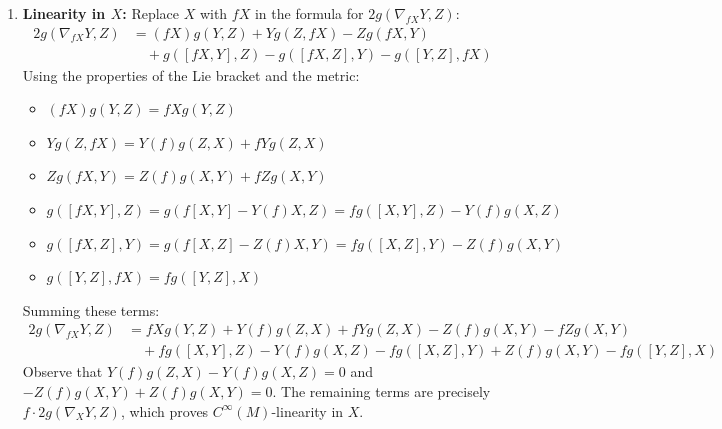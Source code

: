 \begin{solution}
\begin{enumerate}
    \item \textbf{Linearity in $X$:} Replace $X$ with $fX$ in the formula for $2g(\nabla_{fX} Y, Z)$:
    \[ \begin{aligned}
    2g(\nabla_{fX} Y, Z) &= (fX)g(Y, Z) + Yg(Z, fX) - Zg(fX, Y) \\
    &\quad + g([fX, Y], Z) - g([fX, Z], Y) - g([Y, Z], fX)
    \end{aligned} \]
    Using the properties of the Lie bracket and the metric:
    \begin{itemize}
        \item $(fX)g(Y, Z) = f Xg(Y, Z)$
        \item $Yg(Z, fX) = Y(f)g(Z, X) + f Yg(Z, X)$
        \item $Zg(fX, Y) = Z(f)g(X, Y) + f Zg(X, Y)$
        \item $g([fX, Y], Z) = g(f[X, Y] - Y(f)X, Z) = f g([X, Y], Z) - Y(f)g(X, Z)$
        \item $g([fX, Z], Y) = g(f[X, Z] - Z(f)X, Y) = f g([X, Z], Y) - Z(f)g(X, Y)$
        \item $g([Y, Z], fX) = f g([Y, Z], X)$
    \end{itemize}
    Summing these terms:
    \[ \begin{aligned}
    2g(\nabla_{fX} Y, Z) &= f Xg(Y, Z) + Y(f)g(Z, X) + f Yg(Z, X) - Z(f)g(X, Y) - f Zg(X, Y) \\
    &\quad + f g([X, Y], Z) - Y(f)g(X, Z) - f g([X, Z], Y) + Z(f)g(X, Y) - f g([Y, Z], X)
    \end{aligned} \]
    Observe that $Y(f)g(Z, X) - Y(f)g(X, Z) = 0$ and $-Z(f)g(X, Y) + Z(f)g(X, Y) = 0$. The remaining terms are precisely $f \cdot 2g(\nabla_X Y, Z)$, which proves $C^\infty(M)$-linearity in $X$.


\end{enumerate}
\end{solution}
